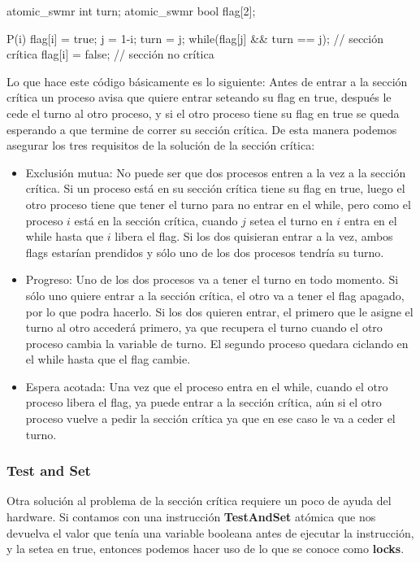 \documentclass{article}
\begin{document}
\begin{code}
atomic_swmr int turn;
atomic_swmr bool flag[2];

P(i) {
    flag[i] = true;
    j = 1-i;
    turn = j;
    while(flag[j] && turn == j);
    // sección crítica
    flag[i] = false;
    // sección no crítica
}
\end{code}

Lo que hace este c\'odigo b\'asicamente es lo siguiente: Antes de entrar a la secci\'on cr\'itica un proceso avisa que quiere entrar seteando su flag en true, despu\'es le cede el turno al otro proceso, y si el otro proceso tiene su flag en true se queda esperando a que termine de correr su secci\'on cr\'itica. De esta manera podemos asegurar los tres requisitos de la soluci\'on de la secci\'on cr\'itica:

\begin{itemize}
\item Exclusi\'on mutua: No puede ser que dos procesos entren a la vez a la secci\'on cr\'itica. Si un proceso est\'a en su secci\'on cr\'itica tiene su flag en true, luego el otro proceso tiene que tener el turno para no entrar en el while, pero como el proceso $i$ est\'a en la secci\'on cr\'itica, cuando $j$ setea el turno en $i$ entra en el while hasta que $i$ libera el flag. Si los dos quisieran entrar a la vez, ambos flags estar\'ian prendidos y s\'olo uno de los dos procesos tendr\'ia su turno.
\item Progreso: Uno de los dos procesos va a tener el turno en todo momento. Si s\'olo uno quiere entrar a la secci\'on cr\'itica, el otro va a tener el flag apagado, por lo que podra hacerlo. Si los dos quieren entrar, el primero que le asigne el turno al otro accederá primero, ya que recupera el turno cuando el otro proceso cambia la variable de turno. El segundo proceso quedara ciclando en el while hasta que el flag cambie.
\item Espera acotada: Una vez que el proceso entra en el while, cuando el otro proceso libera el flag, ya puede entrar a la secci\'on cr\'itica, a\'un si el otro proceso vuelve a pedir la secci\'on cr\'itica ya que en ese caso le va a ceder el turno.
\end{itemize}

\subsubsection{Test and Set}

Otra soluci\'on al problema de la secci\'on cr\'itica requiere un poco de ayuda del hardware. Si contamos con una instrucci\'on \textbf{TestAndSet} at\'omica que nos devuelva el valor que ten\'ia una variable booleana antes de ejecutar la instrucci\'on, y la setea en true, entonces podemos hacer uso de lo que se conoce como \textbf{locks}.
\end{document}
